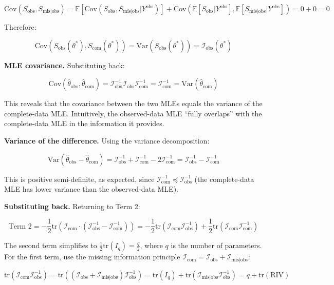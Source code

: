 \documentclass[
]{article}
\begin{document}
\[\text{Cov}(S_{\text{obs}}, S_{\text{mis}|\text{obs}}) = \mathbb{E}[\text{Cov}(S_{\text{obs}}, S_{\text{mis}|\text{obs}}|Y^{\text{obs}})] + \text{Cov}(\mathbb{E}[S_{\text{obs}}|Y^{\text{obs}}], \mathbb{E}[S_{\text{mis}|\text{obs}}|Y^{\text{obs}}]) = 0 + 0 = 0\]

Therefore:

\[\text{Cov}(S_{\text{obs}}(\theta^*), S_{\text{com}}(\theta^*)) = \text{Var}(S_{\text{obs}}(\theta^*)) = \mathcal{I}_{\text{obs}}(\theta^*)\]

\textbf{MLE covariance.} Substituting back:

\[\text{Cov}(\hat{\theta}_{\text{obs}}, \hat{\theta}_{\text{com}}) = \mathcal{I}_{\text{obs}}^{-1} \mathcal{I}_{\text{obs}} \mathcal{I}_{\text{com}}^{-1} = \mathcal{I}_{\text{com}}^{-1} = \text{Var}(\hat{\theta}_{\text{com}})\]

This reveals that the covariance between the two MLEs equals the
variance of the complete-data MLE. Intuitively, the observed-data MLE
``fully overlaps'' with the complete-data MLE in the information it
provides.

\textbf{Variance of the difference.} Using the variance decomposition:

\[\text{Var}(\hat{\theta}_{\text{obs}} - \hat{\theta}_{\text{com}}) = \mathcal{I}_{\text{obs}}^{-1} + \mathcal{I}_{\text{com}}^{-1} - 2\mathcal{I}_{\text{com}}^{-1} = \mathcal{I}_{\text{obs}}^{-1} - \mathcal{I}_{\text{com}}^{-1}\]

This is positive semi-definite, as expected, since
\(\mathcal{I}_{\text{com}}^{-1} \preceq \mathcal{I}_{\text{obs}}^{-1}\)
(the complete-data MLE has lower variance than the observed-data MLE).

\textbf{Substituting back.} Returning to Term 2:

\[\text{Term 2} = -\frac{1}{2}\text{tr}\left(\mathcal{I}_{\text{com}} \cdot \left(\mathcal{I}_{\text{obs}}^{-1} - \mathcal{I}_{\text{com}}^{-1}\right)\right) = -\frac{1}{2}\text{tr}\left(\mathcal{I}_{\text{com}} \mathcal{I}_{\text{obs}}^{-1}\right) + \frac{1}{2}\text{tr}\left(\mathcal{I}_{\text{com}} \mathcal{I}_{\text{com}}^{-1}\right)\]

The second term simplifies to
\(\frac{1}{2}\text{tr}(I_q) = \frac{q}{2}\), where \(q\) is the number
of parameters. For the first term, use the missing information principle
\(\mathcal{I}_{\text{com}} = \mathcal{I}_{\text{obs}} + \mathcal{I}_{\text{mis}|\text{obs}}\):

\[\text{tr}\left(\mathcal{I}_{\text{com}} \mathcal{I}_{\text{obs}}^{-1}\right) = \text{tr}\left((\mathcal{I}_{\text{obs}} + \mathcal{I}_{\text{mis}|\text{obs}}) \mathcal{I}_{\text{obs}}^{-1}\right) = \text{tr}(I_q) + \text{tr}\left(\mathcal{I}_{\text{mis}|\text{obs}} \mathcal{I}_{\text{obs}}^{-1}\right) = q + \text{tr}(\text{RIV})\]
\end{document}
